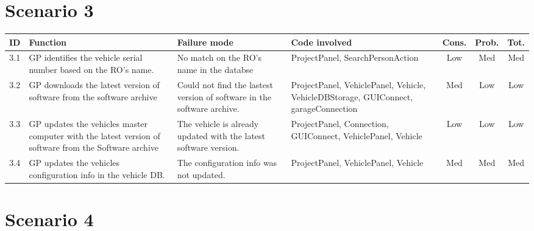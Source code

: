 \begin{landscape}
\begin{longtable}{ c | p{5cm} | p{5cm} | p{5cm} | c | c | c}
		\end{longtable}

	\section{Scenario 3}

		\begin{table}[H]
			\begin{tabular}{ c | p{5cm} | p{5cm} | p{5cm} | c | c | c}
				\hline
				{\bf ID} & {\bf Function} & {\bf Failure mode} & {\bf Code involved} & 
				{\bf Cons.} & {\bf Prob.} & {\bf Tot.} \\ \hline
				3.1 
				& GP identifies the vehicle serial number
				based on the RO's name.  
				& No match on the RO's name in the databse
				& ProjectPanel, SearchPersonAction 
				& Low & Med & Med \\ \hline
				3.2
				& GP downloads the latest version of software
				from the software archive 
				& Could not find the lastest version of software
				in the software archive.
				& ProjectPanel, VehiclePanel, Vehicle, VehicleDBStorage, GUIConnect, garageConnection
				& Med & Low & Low \\ \hline
				3.3 
				& GP updates the vehicles master computer with
				the latest version of software from the Software
				archive 
				& The vehicle is already updated with the latest
				software version.
				& ProjectPanel, Connection, GUIConnect, 
				VehiclePanel, Vehicle
				& Low & Low & Low \\ \hline
				3.4 
				& GP updates the vehicles configuration info 
				in the vehicle DB. 
				& The configuration info was not updated.
				& ProjectPanel, VehiclePanel, 
				Vehicle
				& Med & Med & Med \\ \hline
			\end{tabular}
		\end{table}


	\section{Scenario 4}


\end{landscape}
